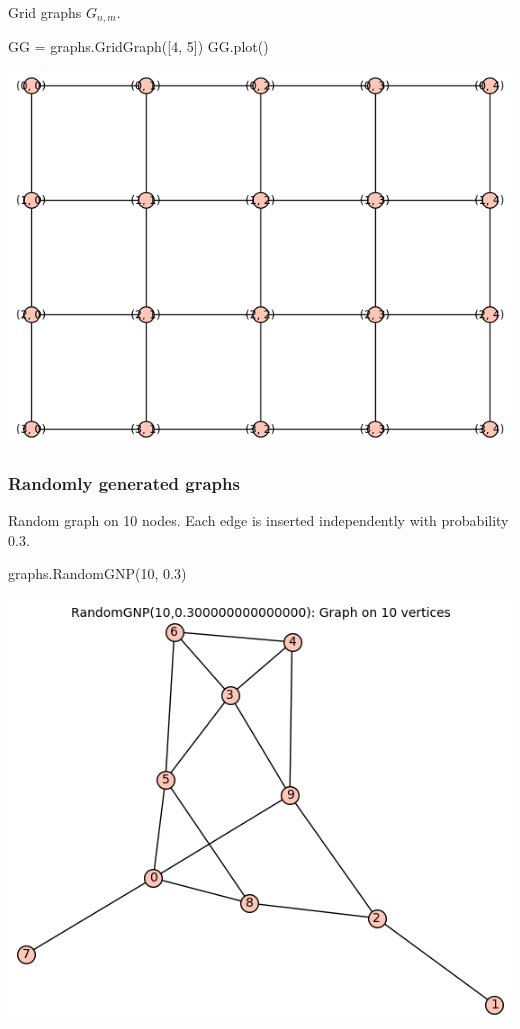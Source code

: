 Grid graphs $G_{n,m}$.
\begin{sageCell}
    GG = graphs.GridGraph([4, 5])
    GG.plot()
\end{sageCell}
\begin{outImage}
    \includegraphics[width=0.8\linewidth]{Images/Introduction/output_grid_4_5.png}
\end{outImage}

\subsubsection{Randomly generated graphs}

Random graph on 10 nodes. Each edge is inserted independently with probability 0.3.
\begin{sageCell}
    graphs.RandomGNP(10, 0.3)
\end{sageCell}
\begin{outImage}
    \includegraphics[width=0.8\linewidth]{Images/Introduction/output_random_10_03.png}
\end{outImage}

